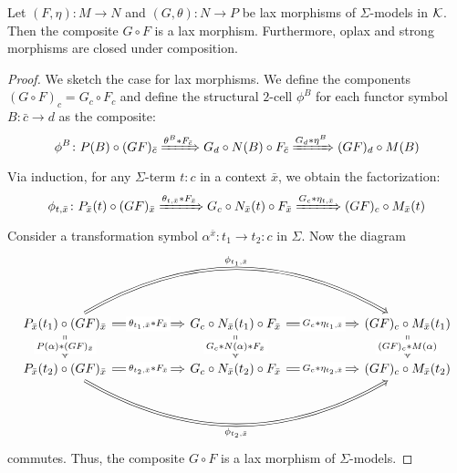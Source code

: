 \begin{proposition}
   Let $(F,\eta) \colon M \to N$ and $(G,\theta) \colon N \to P$ be lax morphisms of $\Sigma$-models in $\mathcal{K}$. Then the composite $G \circ F$ is a lax morphism. Furthermore, oplax and strong morphisms are closed under composition.
\end{proposition}
\begin{proof}
   We sketch the case for lax morphisms. We define the components $(G \circ F)_c = G_c \circ F_c$ and define the structural $2$-cell $\phi^B$ for each functor symbol $B \colon \bar{c} \to d$ as the composite:
   $$
   \phi^B \colon P(B) \circ (GF)_{\bar{c}} \xRightarrow{\theta^B*F_{\bar{c}}} G_d \circ N(B) \circ F_{\bar{c}} \xRightarrow{G_d * \eta^B} (GF)_d \circ M(B)
   $$
   Via induction, for any $\Sigma$-term $t \colon c$ in a context $\bar{x}$, we obtain the factorization:
   \[
   \phi_{t, \bar{x}} \colon P_{\bar{x}}(t) \circ (GF)_{\bar{x}} \xRightarrow{\theta_{t, \bar{x}}*F_{\bar{x}}} G_c \circ N_{\bar{x}}(t) \circ F_{\bar{x}} \xRightarrow{G_c*\eta_{t, \bar{x}}} (GF)_c \circ M_{\bar{x}}(t)
   \]
   Consider a transformation symbol $\alpha^{\bar{x}} \colon t_1 \to t_2\colon c$ in $\Sigma$. Now the diagram
   \[
   \begin{tikzcd}[column sep = 2cm, ampersand replacement=\&]
   P_{\bar{x}}(t_1) \circ (GF)_{\bar{x}} \arrow[d, "P(\alpha)*(GF)_{\bar{x}}" description, Rightarrow] \arrow[rr, "\phi_{t_1, \bar{x}}", Rightarrow, bend left] \arrow[r, "\theta_{t_1, \bar{x}}*F_{\bar{x}}" description, Rightarrow] \& G_c \circ N_{\bar{x}}(t_1) \circ F_{\bar{x}} \arrow[r, "G_c*\eta_{t_1, \bar{x}}" description, Rightarrow] \arrow[d, "G_c*N(\alpha)*F_{\bar{x}}" description, Rightarrow] \& (GF)_c \circ M_{\bar{x}}(t_1) \arrow[d, "(GF)_c*M(\alpha)" description, Rightarrow] \\
   P_{\bar{x}}(t_2) \circ (GF)_{\bar{x}} \arrow[r, "\theta_{t_2, \bar{x}}*F_{\bar{x}}"' description, Rightarrow] \arrow[rr, "\phi_{t_2, \bar{x}}"', Rightarrow, bend right]                                        \& G_c \circ N_{\bar{x}}(t_2) \circ F_{\bar{x}} \arrow[r, "G_c*\eta_{t_2, \bar{x}}"' description, Rightarrow]                                                                \& (GF)_c \circ M_{\bar{x}}(t_2)
   \end{tikzcd}
   \]
   commutes. Thus, the composite $G \circ F$ is a lax morphism of $\Sigma$-models.
\end{proof}

